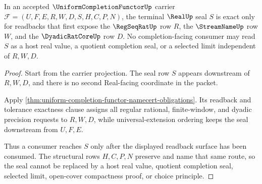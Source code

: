 \begin{theorem}
\label{thm:uniform-completion-functor-readback-seal-exactness}
In an accepted $\UniformCompletionFunctorUp$ carrier $\mathcal{F}=(U,F,E,R,W,D,S,H,C,P,N)$, the terminal $\RealUp$ seal $S$ is exact only for readbacks that first expose the $\RegSeqRatUp$ row $R$, the $\StreamNameUp$ row $W$, and the $\DyadicRatCoreUp$ row $D$. No completion-facing consumer may read $S$ as a host real value, a quotient completion seal, or a selected limit independent of $R,W,D$.
\end{theorem}
\begin{proof}
Start from the carrier projection. The seal row $S$ appears downstream of $R,W,D$, and there is no second Real-facing coordinate in the packet.

Apply \autoref{thm:uniform-completion-functor-namecert-obligations}. Its readback and tolerance exactness clause assigns all regular rational, finite-window, and dyadic precision requests to $R,W,D$, while universal-extension ordering keeps the seal downstream from $U,F,E$.

Thus a consumer reaches $S$ only after the displayed readback surface has been consumed. The structural rows $H,C,P,N$ preserve and name that same route, so the seal cannot be replaced by a host real value, quotient completion seal, selected limit, open-cover compactness proof, or choice principle.
\end{proof}

